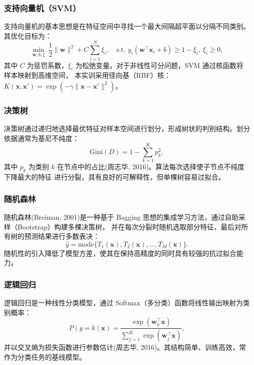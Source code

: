 \documentclass[12pt,a4paper,fontset=fandol]{ctexart}   %
\numberwithin{figure}{section}
\numberwithin{table}{section}
\numberwithin{equation}{section}
\begin{document}
\subsubsection{支持向量机（SVM）}
支持向量机的基本思想是在特征空间中寻找一个最大间隔超平面以分隔不同类别。其优化目标为：
\begin{equation}
\min_{\mathbf{w},b,\xi}\ \frac{1}{2}\|\mathbf{w}\|^2 + C\sum_{i=1}^{N}\xi_i,\quad
\text{s.t. } y_i(\mathbf{w}^\top\mathbf{x}_i+b)\ge 1-\xi_i,\ \xi_i\ge 0,
\end{equation}
其中 $C$ 为惩罚系数，$\xi_i$ 为松弛变量。对于非线性可分问题，SVM 通过核函数将样本映射到高维空间，
本实训采用径向基（RBF）核：$K(\mathbf{x},\mathbf{x}')=\exp(-\gamma\|\mathbf{x}-\mathbf{x}'\|^2)$。

\subsubsection{决策树}
决策树通过递归地选择最优特征对样本空间进行划分，形成树状的判别结构。划分依据通常为基尼不纯度：
\begin{equation}
\mathrm{Gini}(D)=1-\sum_{k=1}^{K}p_k^2,
\end{equation}
其中 $p_k$ 为类别 $k$ 在节点中的占比(周志华, 2016)。算法每次选择使子节点不纯度下降最大的特征
进行分裂，具有良好的可解释性，但单棵树容易过拟合。

\subsubsection{随机森林}
随机森林(Breiman, 2001)是一种基于 Bagging 思想的集成学习方法，通过自助采样（Bootstrap）构建多棵决策树，
并在每次分裂时随机选取部分特征，最后对所有树的预测结果进行多数表决：
\begin{equation}
\hat{y}=\mathrm{mode}\{T_1(\mathbf{x}),T_2(\mathbf{x}),\dots,T_M(\mathbf{x})\}.
\end{equation}
随机性的引入降低了模型方差，使其在保持高精度的同时具有较强的抗过拟合能力。

\subsubsection{逻辑回归}
逻辑回归是一种线性分类模型，通过 Softmax（多分类）函数将线性输出映射为类别概率：
\begin{equation}
P(y=k\mid\mathbf{x})=\frac{\exp(\mathbf{w}_k^\top\mathbf{x})}{\sum_{j=1}^{K}\exp(\mathbf{w}_j^\top\mathbf{x})},
\end{equation}
并以交叉熵为损失函数进行参数估计(周志华, 2016)。其结构简单、训练高效，常作为分类任务的基线模型。
\end{document}
